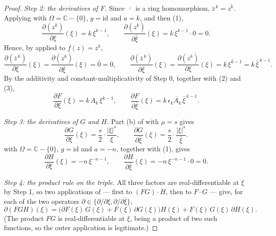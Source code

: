 \begin{proof}
\emph{Step 2: the derivatives of $F$.}  Since $\overline{\,\cdot\,}$ is a ring
homomorphism, $\bar z^{\,k}=\overline{z^{k}}$.  Applying
 with $\Omega=\mathbb{C}-\{0\}$, $g=\mathrm{id}$
and $a=k$, and then (1),
\begin{equation}\tag{2}
  \frac{\partial(z^{k})}{\partial\xi}(\xi)=k\,\xi^{k-1},
  \qquad
  \frac{\partial(z^{k})}{\partial\bar\xi}(\xi)=k\,\xi^{k-1}\cdot0=0 .
\end{equation}
Hence, by  applied to $f(z)=z^{k}$,
\begin{equation}\tag{3}
  \frac{\partial(\bar z^{\,k})}{\partial\xi}(\xi)
  =\overline{\frac{\partial(z^{k})}{\partial\bar\xi}(\xi)}=\bar0=0,
  \qquad
  \frac{\partial(\bar z^{\,k})}{\partial\bar\xi}(\xi)
  =\overline{\frac{\partial(z^{k})}{\partial\xi}(\xi)}
  =\overline{k\,\xi^{k-1}}=k\,\bar\xi^{\,k-1} .
\end{equation}
By the additivity and constant-multiplicativity of Step 0, together with (2)
and (3),
\begin{equation}\tag{4}
  \frac{\partial F}{\partial\xi}(\xi)=k\,A_k\,\xi^{k-1},
  \qquad
  \frac{\partial F}{\partial\bar\xi}(\xi)
  =k\,\epsilon_k\overline{A_k}\,\bar\xi^{\,k-1} .
\end{equation}

\emph{Step 3: the derivatives of $G$ and $H$.}  Part (b) of
 with $\mu=s$ gives
\begin{equation}\tag{5}
  \frac{\partial G}{\partial\xi}(\xi)=\frac{s}{2}\cdot\frac{|\xi|^{s}}{\xi},
  \qquad
  \frac{\partial G}{\partial\bar\xi}(\xi)
    =\frac{s}{2}\cdot\frac{|\xi|^{s}}{\bar\xi} .
\end{equation}
 with $\Omega=\mathbb{C}-\{0\}$, $g=\mathrm{id}$
and $a=-n$, together with (1), gives
\begin{equation}\tag{6}
  \frac{\partial H}{\partial\xi}(\xi)=-n\,\xi^{-n-1},
  \qquad
  \frac{\partial H}{\partial\bar\xi}(\xi)=-n\,\xi^{-n-1}\cdot0=0 .
\end{equation}

\emph{Step 4: the product rule on the triple.}  All three factors are
real-differentiable at $\xi$ by Step 1, so two applications of
 --- first to $(FG)\cdot H$, then to $F\cdot G$
--- give, for each of the two operators $\partial\in\{\partial/\partial\xi,
\partial/\partial\bar\xi\}$,
\begin{equation}\tag{7}
  \partial(FGH)(\xi)
  =\bigl(\partial F(\xi)\,G(\xi)+F(\xi)\,\partial G(\xi)\bigr)H(\xi)
   +F(\xi)\,G(\xi)\,\partial H(\xi).
\end{equation}
(The product $FG$ is real-differentiable at $\xi$, being a product of two such
functions, so the outer application is legitimate.)


\end{proof}
